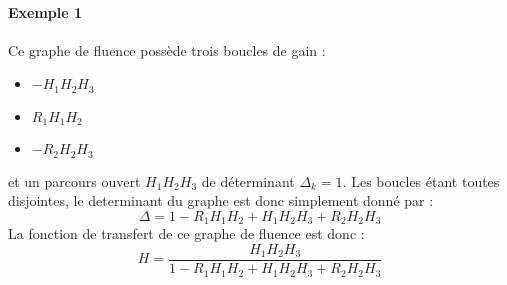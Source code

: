 

\paragraph{Exemple 1}

\begin{center}
\end{center}
Ce graphe de fluence possède trois boucles de gain :
\begin{itemize}
    \item $-H_1H_2H_3$
    \item $R_1H_1H_2$
    \item $-R_2H_2H_3$ 
\end{itemize}
et un parcours ouvert $H_1H_2H_3$ de déterminant $\Delta_k=1$. Les boucles 
étant toutes disjointes, le determinant du graphe est donc simplement 
donné par :
$$
\Delta=1-R_1H_1H_2+H_1H_2H_3+R_2H_2H_3
$$
La fonction de transfert de ce graphe de fluence est donc :
$$
H=\dfrac{H_1H_2H_3}{1-R_1H_1H_2+H_1H_2H_3+R_2H_2H_3}
$$

